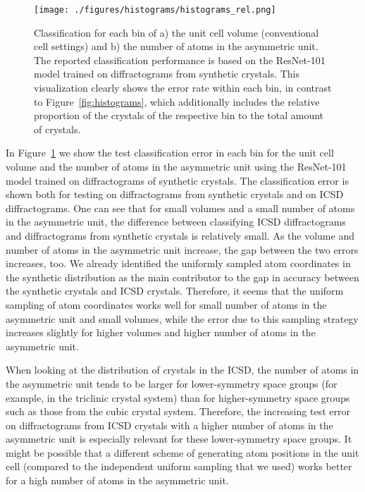     \begin{figure}[!htb]
    \centering
    \texttt{[image: ./figures/histograms/histograms\_rel.png]}
    \caption{Classification  for each bin of a) the unit cell volume
    (conventional cell settings) and b) the number of atoms in the asymmetric
    unit.  The reported classification performance is based on the
    ResNet-101 model trained on diffractograms from synthetic crystals. This
    visualization clearly shows the error rate within each bin, in contrast to
    Figure~\ref{fig:histograms}, which additionally includes the relative
    proportion of the crystals of the respective bin to the total amount of
    crystals.}
    \label{fig:histograms_rel}
    \end{figure}

    In Figure~\ref{fig:histograms_rel} we show the test classification error in
    each bin for the unit cell volume and the number of atoms in the asymmetric
    unit using the ResNet-101 model trained on diffractograms of synthetic
    crystals. The classification error is shown both for testing on
    diffractograms from synthetic crystals and on ICSD diffractograms. One can
    see that for small volumes and a small number of atoms in the asymmetric
    unit, the difference between classifying ICSD diffractograms and
    diffractograms from synthetic crystals is relatively small. As the volume
    and number of atoms in the asymmetric unit increase, the gap between the two
    errors increases, too. We already identified the uniformly sampled atom
    coordinates in the synthetic distribution as the main contributor to the gap
    in accuracy between the synthetic crystals and ICSD crystals. Therefore, it
    seems that the uniform sampling of atom coordinates works well for small 
    number of atoms in the asymmetric unit and small volumes, while the error 
    due to this sampling strategy increases slightly for higher volumes and higher
    number of atoms in the asymmetric unit.
    
    When looking at the distribution of crystals in the ICSD, the number of
    atoms in the asymmetric unit tends to be larger for lower-symmetry space
    groups (for example, in the triclinic crystal system) than for
    higher-symmetry space groups such as those from the cubic crystal system.
    Therefore, the increasing test error on diffractograms from ICSD crystals
    with a higher number of atoms in the asymmetric unit is especially relevant
    for these lower-symmetry space groups.
    It might be possible that a different scheme of generating atom positions in
    the unit cell (compared to the independent uniform sampling that we used)
    works better for a high number of atoms in the asymmetric unit.

